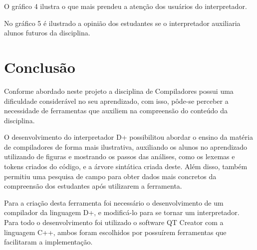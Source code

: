 \documentclass[12pt,oneside,a4paper,chapter=TITLE,section=TITLE,sumario=tradicional]{abntex2}
\begin{document}
\begin{grafico}[H]
\end{grafico}

O gráfico 4 ilustra o que mais prendeu a atenção dos usuários do interpretador.

\begin{grafico}[H]
\end{grafico}

No gráfico 5 é ilustrado a opinião dos estudantes se o interpretador auxiliaria alunos futuros da disciplina.

\begin{grafico}[H]
\end{grafico}

\chapter{Conclusão}
\label{cap:conclusao}

Conforme abordado neste projeto a disciplina de Compiladores possui uma dificuldade considerável no seu aprendizado, com isso, pôde-se perceber a necessidade de ferramentas que auxiliem na compreensão do conteúdo da disciplina.

O desenvolvimento do interpretador D+ possibilitou abordar o ensino da matéria de compiladores de forma mais ilustrativa, auxiliando os alunos no aprendizado utilizando de figuras e mostrando os passos das análises, como os lexemas e tokens criados do código, e a árvore sintática criada deste. Além disso, também permitiu uma pesquisa de campo para obter dados mais concretos da compreensão dos estudantes após utilizarem a ferramenta.

Para a criação desta ferramenta foi necessário o desenvolvimento de um compilador da linguagem D+, e modificá-lo para se tornar um interpretador. Para todo o desenvolvimento foi utilizado o software QT Creator com a linguagem C++, ambos foram escolhidos por possuírem ferramentas que facilitaram a implementação.
\end{document}
